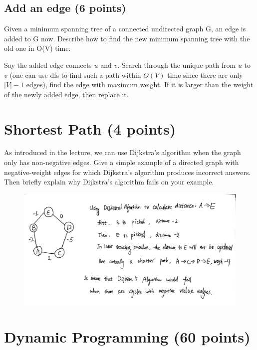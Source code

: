 \documentclass[11pt]{exam}
\begin{document}
\subsection{Add an edge (6 points)}
Given a minimum spanning tree of a connected undirected graph G, an edge is added to G now. Describe how to find the new minimum spanning tree with the old one in O(V) time.
\begin{solution}
Say the added edge connects $u$ and $v$. Search through the unique path from 
$u$ to $v$ (one can use dfs to find such a path within $O(V)$ time since there are only $|V|-1$ edges),
find the edge with maximum weight. If it is larger than the weight of the newly added edge, then replace it.
\end{solution}

\section{Shortest Path (4 points)}
As introduced in the lecture, we can use Dijkstra's algorithm when the graph only has non-negative edges. Give a simple example of a directed graph with negative-weight edges for which Dijkstra's algorithm produces incorrect answers. Then briefly explain why Dijkstra's algorithm fails on your example.
\begin{solution}
\begin{figure}[H]
    \centering
    \includegraphics[width=0.95\linewidth]{hw4_4.jpg}
\end{figure}
\end{solution}

\section{Dynamic Programming (60 points)}
\end{document}
